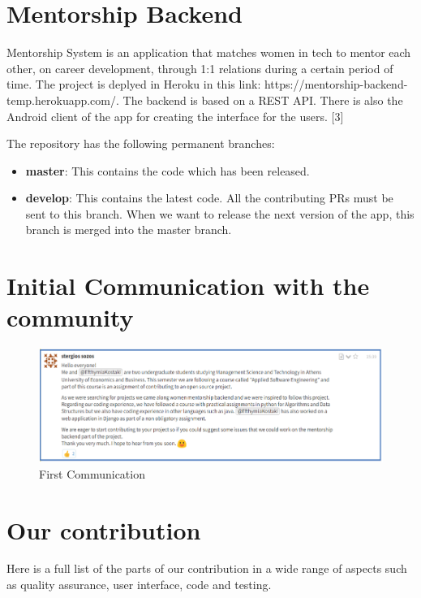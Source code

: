 \documentclass{article}
\begin{document}
\vfill
\clearpage

\section{Mentorship Backend}

\hspace{0.5cm}Mentorship System is an application that matches women in tech to mentor each other, on career development, through 1:1 relations during a certain period of time. The project is deplyed in Heroku in this link: https://mentorship-backend-temp.herokuapp.com/. The backend is based on a REST API. There is also the Android client of the app for creating the interface for the users. [3]

The repository has the following permanent branches:
\begin{itemize}
 \item \textbf{master}: This contains the code which has been released.
 \item \textbf{develop}: This contains the latest code. All the contributing PRs must be sent to this branch. When we want to release the next version of the app, this branch is merged into the master branch. 
\end{itemize}

\section{Initial Communication with the community}
\begin{figure}[tph!]
\centerline{\includegraphics[totalheight=5cm]{FirstCommunication.png}}
    \caption{First Communication}
    \label{fig:verticalcell}
\end{figure}
\vfill
\clearpage

\section{Our contribution}
Here is a full list of the parts of our contribution in a wide range of aspects such as quality assurance, user interface, code and testing. 
\end{document}
